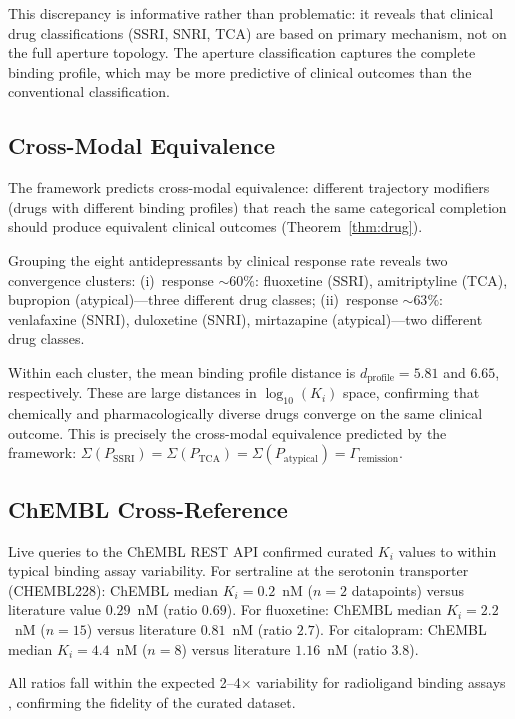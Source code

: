 \documentclass[twocolumn,10pt]{article}
\begin{document}
This discrepancy is informative rather than problematic: it reveals that clinical drug classifications (SSRI, SNRI, TCA) are based on primary mechanism, not on the full aperture topology.  The aperture classification captures the complete binding profile, which may be more predictive of clinical outcomes than the conventional classification.

\subsection{Cross-Modal Equivalence}

The framework predicts cross-modal equivalence: different trajectory modifiers (drugs with different binding profiles) that reach the same categorical completion should produce equivalent clinical outcomes (Theorem~\ref{thm:drug}).

Grouping the eight antidepressants by clinical response rate reveals two convergence clusters: (i)~response $\sim\!60\%$: fluoxetine (SSRI), amitriptyline (TCA), bupropion (atypical)---three different drug classes; (ii)~response $\sim\!63\%$: venlafaxine (SNRI), duloxetine (SNRI), mirtazapine (atypical)---two different drug classes.

Within each cluster, the mean binding profile distance is $d_{\mathrm{profile}} = 5.81$ and $6.65$, respectively.  These are large distances in $\log_{10}(K_{i})$ space, confirming that chemically and pharmacologically diverse drugs converge on the same clinical outcome.  This is precisely the cross-modal equivalence predicted by the framework: $\Sigma(P_{\mathrm{SSRI}}) = \Sigma(P_{\mathrm{TCA}}) = \Sigma(P_{\mathrm{atypical}}) = \Gamma_{\mathrm{remission}}$.

\subsection{ChEMBL Cross-Reference}

Live queries to the ChEMBL REST API confirmed curated $K_{i}$ values to within typical binding assay variability.  For sertraline at the serotonin transporter (CHEMBL228): ChEMBL median $K_{i} = 0.2$~nM ($n = 2$ datapoints) versus literature value $0.29$~nM (ratio $0.69$).  For fluoxetine: ChEMBL median $K_{i} = 2.2$~nM ($n = 15$) versus literature $0.81$~nM (ratio $2.7$).  For citalopram: ChEMBL median $K_{i} = 4.4$~nM ($n = 8$) versus literature $1.16$~nM (ratio $3.8$).

All ratios fall within the expected 2--4$\times$ variability for radioligand binding assays \citep{roth2004multiplicity}, confirming the fidelity of the curated dataset.
\end{document}
